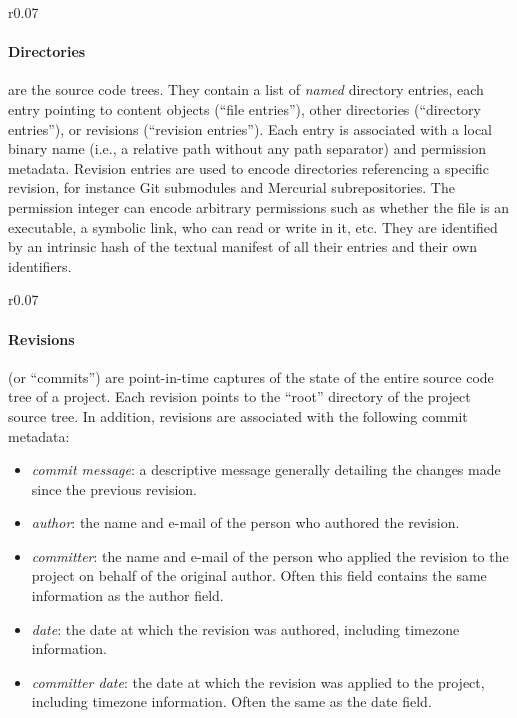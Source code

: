 \begin{wrapfigure}{r}{0.07\textwidth}\centering
{}
\end{wrapfigure}
\paragraph{\textbf{Directories}} are the source code trees. They contain a
list of \emph{named} directory entries, each entry pointing to content objects
(``file entries''), other directories (``directory entries''), or revisions
(``revision entries''). Each entry is associated with a local binary name
(i.e., a relative path without any path separator) and permission metadata.
Revision entries are used to encode directories referencing a specific
revision, for instance Git submodules and Mercurial subrepositories.  The
permission integer can encode arbitrary permissions such as whether the file is
an executable, a symbolic link, who can read or write in it, etc.  They are
identified by an intrinsic hash of the textual manifest of all their entries
and their own identifiers.


\begin{wrapfigure}{r}{0.07\textwidth}\centering
{}
\end{wrapfigure}
\paragraph{\textbf{Revisions}} (or ``commits'') are point-in-time captures of
the state of the entire source code tree of a project. Each revision points to
the ``root'' directory of the project source tree. In addition, revisions are
associated with the following commit metadata:

\begin{itemize}
    \setlength\itemsep{0em}
    \item \emph{commit message}: a descriptive message generally detailing the
        changes made since the previous revision.
    \item \emph{author}: the name and e-mail of the person who authored the
        revision.
    \item \emph{committer}: the name and e-mail of the person who applied the
        revision to the project on behalf of the original author. Often this
        field contains the same information as the author field.
    \item \emph{date}: the date at which the revision was authored, including
        timezone information.
    \item \emph{committer date}: the date at which the revision was applied to
        the project, including timezone information. Often the same as the date
        field.
\end{itemize}

